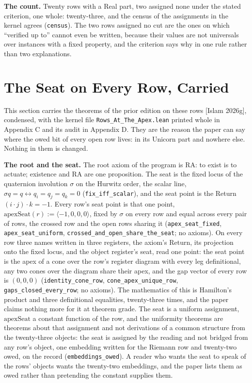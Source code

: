 \documentclass[10pt,twocolumn]{article}
\begin{document}
\textbf{The count.} Twenty rows with a Real part, two assigned none
under the stated criterion, one whole: twenty-three, and the census of
the assignments in the kernel agrees (\texttt{census}). The two rows
assigned no cut are the ones on which ``verified up to'' cannot even be
written, because their values are not universals over instances with a
fixed property, and the criterion says why in one rule rather than two
explanations.

\hypertarget{the-seat-on-every-row-carried}{%
\section{The Seat on Every Row,
Carried}\label{the-seat-on-every-row-carried}}

This section carries the theorems of the prior edition on these rows
{[}Islam 2026g{]}, condensed, with the kernel file
\texttt{Rows\_At\_The\_Apex.lean} printed whole in Appendix C and its
audit in Appendix D. They are the reason the paper can say where the
owed bit of every open row lives: in its Unicorn part and nowhere else.
Nothing in them is changed.

\textbf{The root and the seat.} The root axiom of the program is
\(\mathrm{RA}\): to exist is to actuate; existence and \(\mathrm{RA}\)
are one proposition. The seat is the fixed locus of the quaternion
involution \(\sigma\) on the Hurwitz order, the scalar line,
\(\sigma q = q \leftrightarrow q_i = q_j = q_k = 0\)
(\texttt{fix\_iff\_scalar}), and the seat point is the Return
\((i \cdot j)\cdot k = -1\). Every row's seat point is that one point,
\(\mathrm{apexSeat}(r) := \langle -1, 0, 0, 0\rangle\), fixed by
\(\sigma\) on every row and equal across every pair of rows, the crossed
row and the open rows sharing it (\texttt{apex\_seat\_fixed},
\texttt{apex\_seat\_uniform},
\texttt{crossed\_and\_open\_share\_the\_seat}; no axioms). On every row
three names written in three registers, the axiom's Return, its
projection onto the fixed locus, and the object register's seat, read
one point: the seat point is the apex of a cone over the row's register
diagram with every leg definitional, any two cones over the diagram
share their apex, and the gap vector of every row is \((0, 0, 0)\)
(\texttt{identity\_cone\_row}, \texttt{cone\_apex\_unique\_row},
\texttt{gaps\_closed\_every\_row}; no axioms). The mathematics of this
is Hamilton's product and three definitional equalities, twenty-three
times, and the paper claims nothing more for it at theorem grade. The
seat is a uniform assignment, \(\mathrm{apexSeat}\) a constant function
of the row, and the uniformity theorems are theorems about that
assignment and not derivations of a common structure from the
twenty-three objects: the seat is assigned by the reading and not
bridged from any row's object, one embedding written for the Riemann row
and twenty-two owed, on the record (\texttt{embeddings\_owed}). A reader
who wants the seat to speak of the rows' objects wants the twenty-two
embeddings, and the paper lists them as owed rather than pretending the
constant supplies them.
\end{document}
